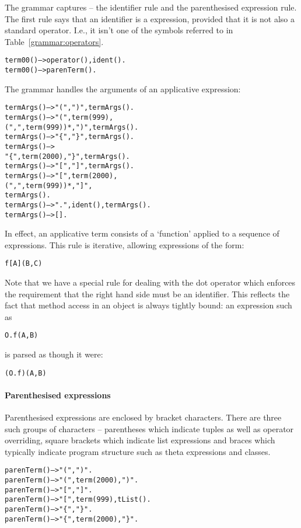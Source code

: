 The  grammar captures -- the identifier rule and the parenthesised expression rule. The first rule says that an identifier is a  expression, provided that it is not also a standard operator. I.e., it isn't one of the symbols referred to in Table~\vref{grammar:operators}. 
\begin{alltt}
term00() --> \nasf{}operator(), ident().
term00() --> parenTerm().
\end{alltt}
The  grammar handles the arguments of an applicative expression:
\begin{alltt}
termArgs() --> "(", ")", termArgs().
termArgs() --> "(", term(999), 
    (",",term(999))*,")", termArgs().
termArgs() --> "\{", "\}", termArgs().
termArgs() --> 
    "\{",term(2000),"\}", termArgs().
termArgs() --> "[", "]", termArgs().
termArgs() --> "[",term(2000),
    (",",term(999))*,"]",
    termArgs().
termArgs() --> ".", ident(), termArgs().
termArgs()-->[].
\end{alltt}
In effect, an applicative term consists of a `function' applied to a sequence of expressions. This rule is iterative, allowing expressions of the form:
\begin{alltt}
f[A](B,C)
\end{alltt}
Note that we have a special rule for dealing with the dot operator which enforces the requirement that the right hand side must be an identifier. This reflects the fact that method access in an object is always tightly bound: an expression such as
\begin{alltt}
O.f(A,B)
\end{alltt}
is parsed as though it were:
\begin{alltt}
(O.f)(A,B)
\end{alltt}

\paragraph{Parenthesised expressions}
Parenthesised expressions are enclo\-sed by brack\-et characters. There are three such groups of characters -- parentheses \q{()} which indicate tuples as well as operator overriding, square brackets \q{[]} which indicate list expressions and braces \q{\{\}} which typically indicate program structure such as theta expressions and classes.

\begin{alltt}
parenTerm() --> "(", ")".
parenTerm() --> "(",term(2000),")".
parenTerm() --> "[", "]".
parenTerm() --> "[", term(999), tList().
parenTerm() --> "\{", "\}".
parenTerm() --> "\{", term(2000), "\}".
\end{alltt}

